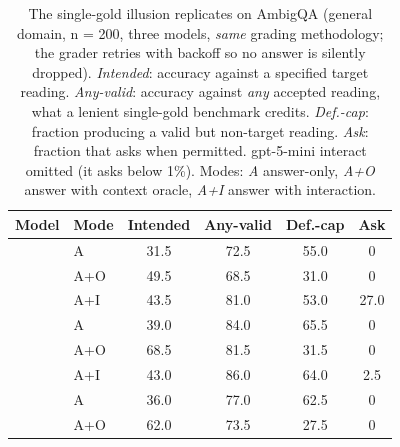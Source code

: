 \begin{table}[t]
\centering

\small
\setlength{\tabcolsep}{5pt}
\begin{tabular}{@{}llcccc@{}}
\toprule
Model & Mode & Intended & Any-valid & Def.-cap & Ask \\
\midrule
{}
 & A   & 31.5 & 72.5 & 55.0 & 0 \\
 & A+O & 49.5 & 68.5 & 31.0 & 0 \\
 & A+I & 43.5 & 81.0 & 53.0 & 27.0 \\
\midrule
{}
 & A   & 39.0 & 84.0 & 65.5 & 0 \\
 & A+O & 68.5 & 81.5 & 31.5 & 0 \\
 & A+I & 43.0 & 86.0 & 64.0 & 2.5 \\
\midrule
{}
 & A   & 36.0 & 77.0 & 62.5 & 0 \\
 & A+O & 62.0 & 73.5 & 27.5 & 0 \\
\bottomrule
\end{tabular}
\caption{The single-gold illusion replicates on AmbigQA (general domain,
n = 200, three models, \emph{same} grading methodology; the grader retries with
backoff so no answer is silently dropped). \emph{Intended}: accuracy against a
specified target reading. \emph{Any-valid}: accuracy against \emph{any} accepted
reading, what a lenient single-gold benchmark credits. \emph{Def.-cap}: fraction
producing a valid but non-target reading. \emph{Ask}: fraction that asks when
permitted. gpt-5-mini interact omitted (it asks below 1\%).
Modes: \emph{A} answer-only, \emph{A+O} answer with context oracle,
\emph{A+I} answer with interaction.}
\label{tab:general}
\end{table}

